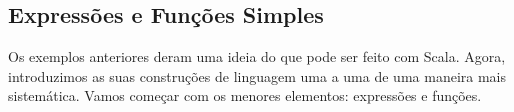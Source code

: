 \begin{itemize}


\chapter{\label{chap:simple-funs}Expressões e Funções Simples}

Os exemplos anteriores deram uma ideia do que pode ser feito com Scala. Agora,
introduzimos as suas construções de linguagem uma a uma de uma maneira mais sistemática.
Vamos começar com os menores elementos: expressões e funções.



\end{itemize}
